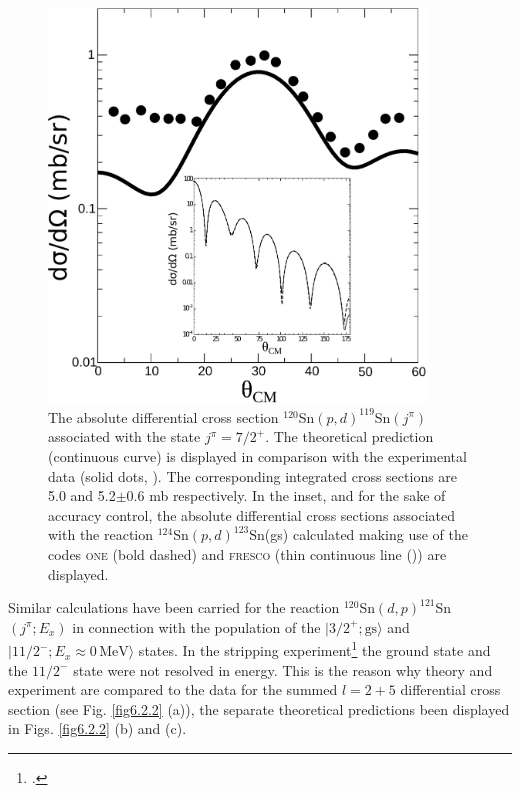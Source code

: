     \begin{figure}
    \centerline{\includegraphics*[width=10cm,angle=0]{C6/figs_C6/fig6_2_1x.pdf}}
    \caption{ The absolute differential cross section $^{120}$Sn$(p,d)^{119}$Sn$(j^\pi)$ associated with the state $j^\pi=7/2^+$. The theoretical prediction (continuous curve) is displayed in comparison with the experimental data (solid dots,  \cite{Dickey:82}). The corresponding integrated cross sections are 5.0 and 5.2$\pm0.6$ mb respectively. In the inset, and for the sake of accuracy control, the absolute differential cross sections associated with the reaction $^{124}$Sn$(p,d)^{123}$Sn(gs) calculated making use of the codes \textsc{one} (bold dashed) and \textsc{fresco} (thin continuous line (\cite{Thompson:88})) are displayed. }\label{fig6.2.1}
    \end{figure}
  Similar calculations have been carried for the reaction $^{120}$Sn$(d,p)^{121}$Sn $(j^{\pi};E_x)$ in connection with the population 	of the $|3/2^+; \text{gs}\rangle$ and $|11/2^-;E_x\approx 0\, \text{MeV}\rangle$ states.
  In the stripping  experiment\footnote{\cite{Bechara:75}.} the 	ground state and the $11/2^-$ state were not resolved in energy. This is the reason why theory and experiment are  compared to the data for the summed $l=2+5$ differential cross section (see Fig. \ref{fig6.2.2} (a)), the separate theoretical predictions been displayed in Figs. \ref{fig6.2.2} (b) and (c).

    
    
